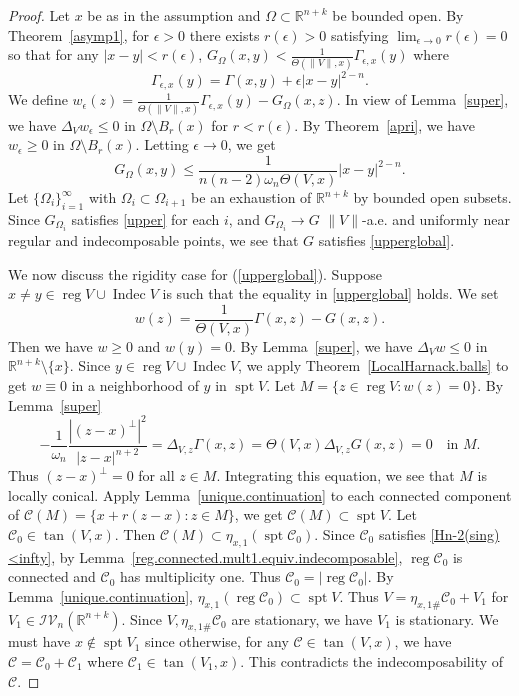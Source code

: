 \documentclass[11pt]{amsart}
\theoremstyle{definition}
\newcommand{\R}{\mathbb{R}}
\newcommand{\C}{\mathcal{C}}
\newcommand{\IV}{\mathcal{IV}}
\DeclareMathOperator{\spt}{spt}
\DeclareMathOperator{\reg}{reg}
\DeclareMathOperator{\indec}{Indec}
\begin{document}
\begin{proof}
    Let $x$ be as in the assumption and $\Omega\subset\R^{n+k}$ be bounded open. By Theorem~\ref{asymp1}, for $\epsilon>0$ there exists $r(\epsilon)>0$ satisfying $\lim_{\epsilon\to0}r(\epsilon)=0$ so that for any $|x-y|<r(\epsilon)$, $G_\Omega(x,y)<\frac{1}{\Theta(\|V\|,x)}\Gamma_{\epsilon,x}(y)$  where \[\Gamma_{\epsilon,x}(y)=\Gamma(x,y)+\epsilon|x-y|^{2-n}.\] We define $w_\epsilon(z)=\frac{1}{\Theta(\|V\|,x)}\Gamma_{\epsilon,x}(y)-G_\Omega(x,z)$. In view of Lemma~\ref{super}, we have $\Delta_V w_\epsilon\le 0$ in $\Omega\setminus B_r(x)$ for $r<r(\epsilon)$. By Theorem~\ref{apri}, we have $w_\epsilon\ge 0$ in $\Omega\setminus B_r(x)$. Letting $\epsilon\to0$, we get \begin{equation}\label{upper}
        G_\Omega(x,y)\le\frac{1}{n(n-2)\omega_n\Theta(V,x)}|x-y|^{2-n}.
    \end{equation}
    Let $\{\Omega_i\}_{i=1}^\infty$ with $\Omega_i\subset \Omega_{i+1}$ be an exhaustion of $\R^{n+k}$ by bounded open subsets.
    Since $G_{\Omega_i}$ satisfies \eqref{upper} for each $i$, and $G_{\Omega_i}\to G$ $\|V\|$-a.e. and uniformly near regular and indecomposable points, we see that $G$ satisfies \eqref{upperglobal}.
    
    
	We now discuss the rigidity case for (\ref{upperglobal}). Suppose $x\neq y\in \reg V\cup \indec V$ is such that the equality in \eqref{upperglobal} holds. We set \[w(z)=\frac{1}{\Theta(V,x)}\Gamma(x,z)-G(x,z).\] Then we have $w\ge 0$ and $w(y)=0$. By Lemma~\ref{super}, we have $\Delta_V w\le 0$ in $\R^{n+k}\setminus\{x\}$. Since $y\in \reg V\cup \indec V$, we apply Theorem~\ref{LocalHarnack.balls} to get $w\equiv 0$ in a neighborhood of $y$ in $\spt V$. Let $M=\{z\in \reg V:w(z)=0\}$. By Lemma~\ref{super} 
    \[ -\frac{1}{\omega_n}\frac{|(z-x)^\perp|^2}{|z-x|^{n+2}}=\Delta_{V,z} \Gamma(x,z)=\Theta (V,x)\Delta_{V,z}G(x,z)=0\quad \text{in }M.\]
	Thus $(z-x)^\perp=0$ for all $z\in M$. Integrating this equation, we see that $M$ is locally conical. Apply Lemma~\ref{unique.continuation} to each connected component of $\C(M)=\{x+r(z-x):z\in M\}$, we get $\C(M)\subset \spt V$. Let $\C_0\in \tan(V,x)$. Then $\C(M)\subset \eta_{x,1}(\spt \C_0)$. Since $\C_0$ satisfies \eqref{Hn-2(sing)<infty}, by Lemma~\ref{reg.connected.mult1.equiv.indecomposable}, $\reg\C_0$ is connected and $\C_0$ has multiplicity one. Thus $\C_0=|\reg \C_0|$. By Lemma~\ref{unique.continuation}, $\eta_{x,1}(\reg \C_0) \subset \spt V$. Thus $V=\eta_{x,1\#}\C_0+V_1$ for $V_1\in \IV_n(\R^{n+k})$. Since $V,\eta_{x,1\#}\C_0$ are stationary, we have $V_1$ is stationary. We must have $x\notin \spt V_1$ since otherwise, for any $\C\in \tan(V,x)$, we have $\C=\C_0+\C_1$ where $\C_1\in \tan(V_1,x)$. This contradicts the indecomposability of $\C$.
\end{proof}
\end{document}
